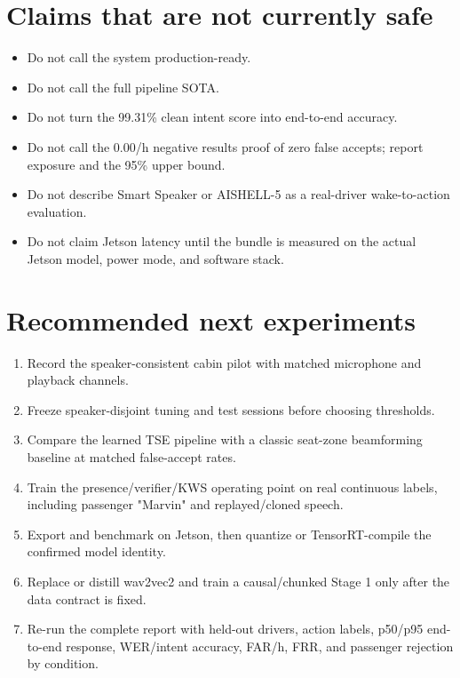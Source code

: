 \documentclass[11pt,a4paper]{article}
\begin{document}
\section{Claims that are not currently safe}

\begin{itemize}[leftmargin=*]
  \item Do not call the system production-ready.
  \item Do not call the full pipeline SOTA.
  \item Do not turn the 99.31\% clean intent score into end-to-end accuracy.
  \item Do not call the 0.00/h negative results proof of zero false accepts;
        report exposure and the 95\% upper bound.
  \item Do not describe Smart Speaker or AISHELL-5 as a real-driver
        wake-to-action evaluation.
  \item Do not claim Jetson latency until the bundle is measured on the actual
        Jetson model, power mode, and software stack.
\end{itemize}

\section{Recommended next experiments}

\begin{enumerate}[leftmargin=*]
  \item Record the speaker-consistent cabin pilot with matched microphone and
        playback channels.
  \item Freeze speaker-disjoint tuning and test sessions before choosing
        thresholds.
  \item Compare the learned TSE pipeline with a classic seat-zone
        beamforming baseline at matched false-accept rates.
  \item Train the presence/verifier/KWS operating point on real continuous
        labels, including passenger "Marvin" and replayed/cloned speech.
  \item Export and benchmark on Jetson, then quantize or TensorRT-compile the
        confirmed model identity.
  \item Replace or distill wav2vec2 and train a causal/chunked Stage 1 only
        after the data contract is fixed.
  \item Re-run the complete report with held-out drivers, action labels,
        p50/p95 end-to-end response, WER/intent accuracy, FAR/h, FRR, and
        passenger rejection by condition.
\end{enumerate}
\end{document}
